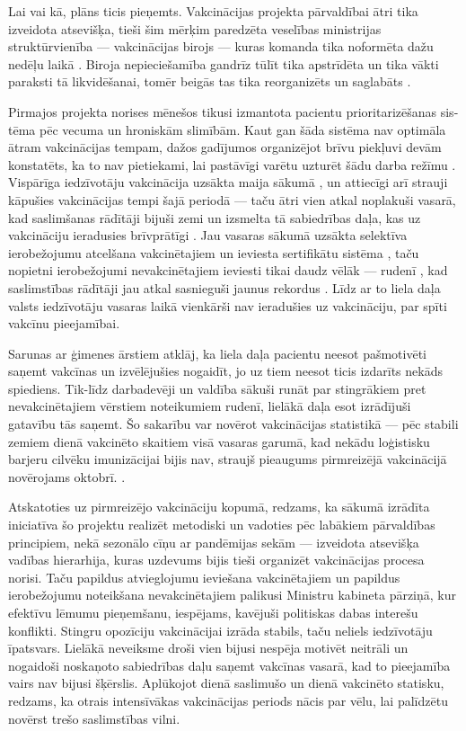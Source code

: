 \documentclass[12pt, a4paper]{article}
\numberwithin{equation}{section} %
\begin{document}
Lai vai kā, plāns ticis pieņemts. Vakcinācijas projekta pārvaldībai ātri tika izveidota atsevišķa, tieši šim mērķim paredzēta veselības ministrijas struktūrvienība --- vakcinācijas birojs \cite{vaxx_bureau_proposed} --- kuras komanda tika noformēta dažu nedēļu laikā \cite{vaxx_bureau_leadership}. Biroja nepieciešamība gandrīz tūlīt tika apstrīdēta un tika vākti paraksti tā likvidēšanai, tomēr beigās tas tika reorganizēts un saglabāts \cite{vaxx_bureau_reorganized}.

Pirmajos projekta norises mēnešos tikusi izmantota pacientu prioritarizēšanas sis-tēma pēc vecuma un hroniskām slimībām. Kaut gan šāda sistēma nav optimāla ātram vakcinācijas tempam, dažos gadījumos organizējot brīvu piekļuvi devām konstatēts, ka to nav pietiekami, lai pastāvīgi varētu uzturēt šādu darba režīmu \cite{vaxx_queue}. Vispārīga iedzīvotāju vakcinācija uzsākta maija sākumā \cite{vaxx_all}, un attiecīgi arī strauji kāpušies vakcinācijas tempi šajā periodā --- taču ātri vien atkal noplakuši vasarā, kad saslimšanas rādītāji bijuši zemi un izsmelta tā sabiedrības daļa, kas uz vakcināciju ieradusies brīvprātīgi \cite{vaxx_stats}. Jau vasaras sākumā uzsākta selektīva ierobežojumu atcelšana vakcinētajiem un ieviesta sertifikātu sistēma \cite{vaxx_cert}, taču nopietni ierobežojumi nevakcinētajiem ieviesti tikai daudz vēlāk --- rudenī \cite{lv_fire_unvaccinated}, kad saslimstības rādītāji jau atkal sasnieguši jaunus rekordus \cite{lv_stats}. Līdz ar to liela daļa valsts iedzīvotāju vasaras laikā vienkārši nav ieradušies uz vakcināciju, par spīti vakcīnu pieejamībai. 

Sarunas ar ģimenes ārstiem atklāj, ka liela daļa pacientu neesot pašmotivēti saņemt vakcīnas un izvēlējušies nogaidīt, jo uz tiem neesot ticis izdarīts nekāds spiediens. Tik-līdz darbadevēji un valdība sākuši runāt par stingrākiem pret nevakcinētajiem vērstiem noteikumiem rudenī, lielākā daļa esot izrādījuši gatavību tās saņemt. Šo sakarību var novērot vakcinācijas statistikā --- pēc stabili zemiem dienā vakcinēto skaitiem visā vasaras garumā, kad nekādu loģistisku barjeru cilvēku imunizācijai bijis nav, straujš pieaugums pirmreizējā vakcinācijā novērojams oktobrī. \cite{vaxx_stats}. 

Atskatoties uz pirmreizējo vakcināciju kopumā, redzams, ka sākumā izrādīta iniciatīva šo projektu realizēt metodiski un vadoties pēc labākiem pārvaldības principiem, nekā sezonālo cīņu ar pandēmijas sekām --- izveidota atsevišķa vadības hierarhija, kuras uzdevums bijis tieši organizēt vakcinācijas procesa norisi. Taču papildus atvieglojumu ieviešana vakcinētajiem un papildus ierobežojumu noteikšana nevakcinētajiem palikusi Ministru kabineta pārziņā, kur efektīvu lēmumu pieņemšanu, iespējams, kavējuši politiskas dabas interešu konflikti. Stingru opozīciju vakcinācijai izrāda stabils, taču neliels iedzīvotāju īpatsvars. Lielākā neveiksme droši vien bijusi nespēja motivēt neitrāli un nogaidoši noskaņoto sabiedrības daļu saņemt vakcīnas vasarā, kad to pieejamība vairs nav bijusi šķērslis. Aplūkojot dienā saslimušo \cite{lv_stats} un dienā vakcinēto \cite{vaxx_stats} statisku, redzams, ka otrais intensīvākas vakcinācijas periods nācis par vēlu, lai palīdzētu novērst trešo saslimstības vilni.
\end{document}
